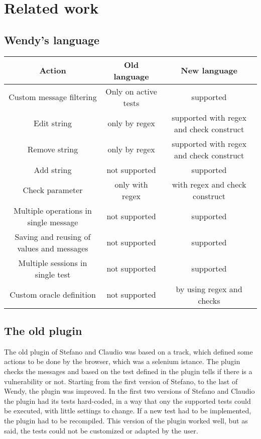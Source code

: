 \chapter{Related work}

\section{Wendy's language}
\begin{center}
    \begin{tabular}{ |c|c|c| }
        \hline
        Action                                    & Old language         & New language                             \\
        \hline\hline
        Custom message filtering                  & Only on active tests & supported                                \\
        Edit string                               & only by regex        & supported with regex and check construct \\
        Remove string                             & only by regex        & supported with regex and check construct \\
        Add string                                & not supported        & supported                                \\
        Check parameter                           & only with regex      & with regex and check construct           \\
        Multiple operations in single message     & not supported        & supported                                \\
        Saving and reusing of values and messages & not supported        & supported                                \\
        Multiple sessions in single test          & not supported        & supported                                \\
        Custom oracle definition                  & not supported        & by using regex and checks                \\
        \hline
    \end{tabular}
\end{center}

\section{The old plugin}
The old plugin of Stefano and Claudio was based on a track, which defined some actions to be done by the browser, which was a selenium istance. The plugin checks the messages and based on the test defined in the plugin tells if there is a vulnerability or not.
Starting from the first version of Stefano, to the last of Wendy, the plugin was improved. In the first two versions of Stefano and Claudio the plugin had its tests hard-coded, in a way that ony the supported tests could be executed, with little settings to change. If a new test had to be implemented, the plugin had to be recompiled. This version of the plugin worked well, but as said, the tests could not be customized or adapted by the user.

